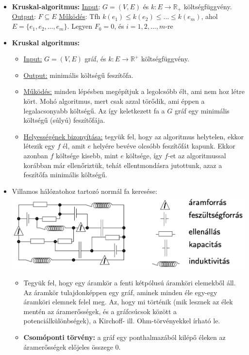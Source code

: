 \documentclass[../../szobeli.tex]{subfiles}
\begin{document}
\begin{itemize}
        \item \textbf{Kruskal-algoritmus:} \underline{Input}: $G=(V,E)$ és $k:E \rightarrow \mathbb{R}_+$ költségfüggvény. \underline{Output}: $F \subseteq E$ \underline{Működés}: Tfh $k(e_1) \leq k(e_2) \leq \dots \leq k(e_m)$, ahol $E=\{e_1,e_2,\dots, e_m\}$. Legyen $F_0=0$, és $i=1,2,\dots,m$-re
        \item \textbf{Kruskal algoritmus:} \begin{itemize}
            \item \underline{Input:} $G=(V,E)$ gráf, és $k:E\rightarrow \mathbb{R}^+$ költségfüggvény.
            \item \underline{Output:} minimális költségű feszítőfa.
            \item \underline{Működés:} minden lépésben megépítjuk a legolcsóbb élt, ami nem hoz létre kört. Mohó algoritmus, mert csak azzal törődik, ami éppen a legalacsonyabb költségű. Az így keletkezett fa a $G$ gráf egy minimális költségű (súlyú) feszítőfája.
            \item \underline{Helyességének bizonyítása:} tegyük fel, hogy az algoritmus helytelen, ekkor létezik egy $f$ él, amit $e$ helyére bevéve olcsóbb feszítőfát kapunk. Ekkor azonban $f$ költsége kisebb, mint $e$ költsége, így $f$-et az algoritmussal korábban már ellenőriztük, tehát ellentmondásra jutottunk, azaz a feszítőfa minimális költségű.
        \end{itemize}
        \item Villamos hálózatohoz tartozó normál fa keresése: \\ \includegraphics[scale=0.45]{./img/1.png} \begin{itemize}
            \item Tegyük fel, hogy egy áramkör a fenti kétpólusú áramköri elemekből áll. Az áramkör tulajdonképpen egy gráf, aminek minden éle egy-egy áramköri elemnek felel meg. Az, hogy mi történik (mik lesznek az élek mentén az áramerősségek, és a gráfcsúcsok között a potenciálkülönbségek), a Kirchoff- ill. Ohm-törvényekkel írható le.
            \item \textbf{Csomóponti törvény:} a gráf egy ponthalmazából kilépő éleken az áramerősségek előjeles összege 0.

\end{itemize}
\end{itemize}
\end{document}
